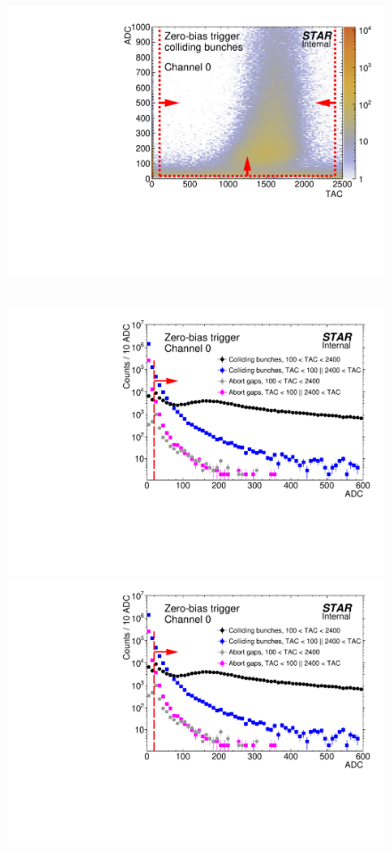 \begin{figure}[hb]
{  \includegraphics[width=\linewidth,page=48]{graphics/eventSelection/bbc/Bbc_ADCvsTAC_collidingBunches.pdf}
}~
\parbox{0.327\textwidth}{
  \centering
  \includegraphics[width=\linewidth,page=44]{graphics/eventSelection/bbc/Bbc_ADC.pdf}\\
  \includegraphics[width=\linewidth,page=45]{graphics/eventSelection/bbc/Bbc_ADC.pdf}\\
}
\end{figure}
